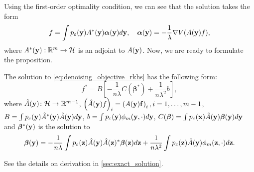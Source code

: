 Using the first-order optimality condition, we can see that the solution takes the form
\[
    f = \int p_{\varepsilon}({\bf y})A^*({\bf y}){\bm \alpha}({\bf y})d {\bf y},
    \quad
    {\bm \alpha}({\bf y}) = -\frac{1}{\lambda}\nabla V(A({\bf y})f),
\]
where $A^*({\bf y}): \mathbb{R}^m \to \mathcal{H}$ is an adjoint to $A({\bf y})$.
Now, we are ready to formulate the proposition.
\begin{proposition}
    The solution to \eqref{eq:denoising_objective_rkhs} has the following form:
    \[
        f^* = B \left [
            -\frac{1}{n\lambda}C(\bm{\beta}^*) + \frac{1}{n\lambda^2}b
        \right ],
    \]
    where
    $\hat{A}({\bf y}) \colon \mathcal{H} \to \mathbb{R}^{m - 1}$,
    $\left ( \hat{A}({\bf y})f \right )_i = \left( A(\bf{y})f \right )_i, i=1, \ldots, m-1$,
    \newline
    $B = \int p_{\varepsilon}({\bf y})\hat{A}^*({\bf y})\hat{A}({\bf y}) d{\bf y}$,
    $b = \int p_{\varepsilon}({\bf y})\phi_m({\bf y}, \cdot) d {\bf y}$,
    $C(\bm{\beta}) = \int p_{\varepsilon}({\bf x})\hat{A}({\bf y})\bm{\beta}({\bf y})d{\bf y}$
    and ${\bm\beta}^*({\bf y})$ is the solution to
    \begin{equation}
        \bm{\beta}({\bf y}) = -\frac{1}{n\lambda}
        \int p_{\varepsilon}({\bf z}) \hat{A}({\bf y})\hat{A}({\bf z})^*\bm{\beta}({\bf z})
        d{\bf z}
        + \frac{1}{n\lambda^2}
        \int p_{\varepsilon}({\bf z}) \hat{A}({ \bf y}) \phi_m({\bf z}, \cdot)d{\bf z}.
    \label{eq:beta_integal}
    \end{equation}
\end{proposition}
See the details on derivation in \ref{sec:exact_solution}.

